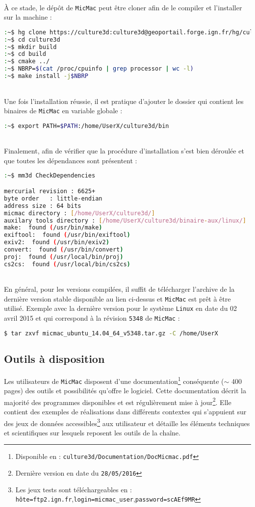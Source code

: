 ~\\
À ce stade, le dépôt de {\tt MicMac} peut être cloner afin de le compiler et l'installer sur la machine :
\begin{lstlisting}[language=bash]
:~$ hg clone https://culture3d:culture3d@geoportail.forge.ign.fr/hg/culture3d
:~$ cd culture3d
:~$ mkdir build
:~$ cd build
:~$ cmake ../
:~$ NBRP=$(cat /proc/cpuinfo | grep processor | wc -l)
:~$ make install -j$NBRP
\end{lstlisting}
~\\
Une fois l'installation réussie, il est pratique d'ajouter le dossier qui contient les binaires de {\tt MicMac} en variable globale :
\begin{lstlisting}[language=bash]
:~$ export PATH=$PATH:/home/UserX/culture3d/bin
\end{lstlisting}
~\\
Finalement, afin de vérifier que la procédure d’installation s'est bien déroulée et que toutes les dépendances sont présentent :
\begin{lstlisting}[language=bash]
:~$ mm3d CheckDependencies

mercurial revision : 6625+
byte order   : little-endian
address size : 64 bits
micmac directory : [/home/UserX/culture3d/]
auxilary tools directory : [/home/UserX/culture3d/binaire-aux/linux/]
make:  found (/usr/bin/make)
exiftool:  found (/usr/bin/exiftool)
exiv2:  found (/usr/bin/exiv2)
convert:  found (/usr/bin/convert)
proj:  found (/usr/local/bin/proj)
cs2cs:  found (/usr/local/bin/cs2cs)
\end{lstlisting}
~\\
En général, pour les versions compilées, il suffit de télécharger l'archive de la dernière version stable disponible au lien ci-dessus et {\tt MicMac} est prêt à être utilisé. Exemple avec la dernière version pour le système {\tt Linux} en date du 02 avril 2015 et qui correspond à la révision {\tt 5348} de {\tt MicMac} :

\begin{lstlisting}[language=bash]
$ tar zxvf micmac_ubuntu_14.04_64_v5348.tar.gz -C /home/UserX 
\end{lstlisting}

\subsection{Outils à disposition}
Les utilisateurs de {\tt MicMac} disposent d'une documentation\footnote{Disponible en : {\tt culture3d/Documentation/DocMicmac.pdf}} conséquente ($\sim$ 400 pages) des outils et possibilités qu'offre le logiciel. Cette documentation décrit la majorité des programmes disponibles et est régulièrement mise à jour\footnote{Dernière version en date du {\tt 28/05/2016}}. Elle contient des exemples de réalisations dans différents contextes qui s’appuient sur des jeux de données accessibles\footnote{Les jeux tests sont téléchargeables en : {\tt hôte=ftp2.ign.fr},{\tt login=micmac\_user},{\tt password=scAEf9MR}} aux utilisateur et détaille les éléments techniques et scientifiques sur lesquels reposent les outils de la chaîne.\newline

